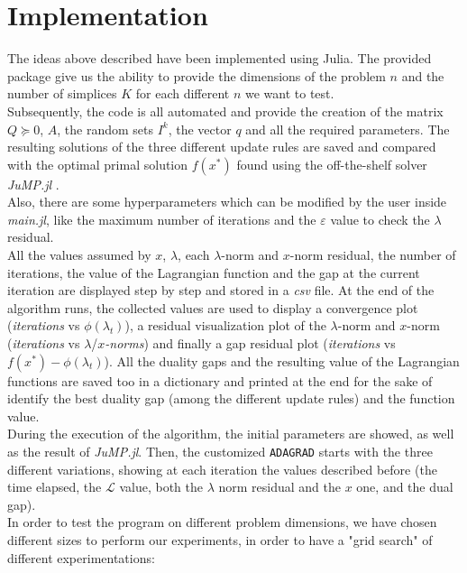 \documentclass[notitlepage]{article}
\begin{document}
\section{Implementation}
The ideas above described have been implemented using Julia. The provided package give us the ability to provide the dimensions of the problem $n$ and the number of simplices $K$ for each different $n$ we want to test.\\
Subsequently, the code is all automated and provide the creation of the matrix $Q \succeq 0$, $A$, the random sets $I^k$, the vector $q$ and all the required parameters. The resulting solutions 
of the three different update rules are saved and compared with the optimal primal solution $f(x^*)$ found using the off-the-shelf solver \textit{JuMP.jl} \cite{DunningHuchetteLubin2017}.\\
Also, there are some hyperparameters which can be modified by the user inside \textit{main.jl}, like the maximum number of iterations and the $\varepsilon$ value to check the $\lambda$ residual.\\
All the values assumed by $x$, $\lambda$, each $\lambda$-norm and $x$-norm residual, the number of iterations, the value of the Lagrangian function and the gap at the current iteration are displayed 
step by step and stored in a \textit{csv} file. At the end of the algorithm runs, the collected values are used to display a convergence plot (\textit{iterations} vs $\phi(\lambda_t)$), a residual visualization plot of the 
$\lambda$-norm and $x$-norm (\textit{iterations} vs $\lambda$/$x$\textit{-norms}) and finally a gap residual plot (\textit{iterations} vs $f(x^*) - \phi(\lambda_t)$). All the duality gaps and the resulting value 
of the Lagrangian functions are saved too in a dictionary and printed at the end for the sake of identify the best duality gap (among the different update rules) and the function value.\\
During the execution of the algorithm, the initial parameters are showed, as well as the result of \textit{JuMP.jl}. Then, the customized \texttt{ADAGRAD} starts with the three different variations, 
showing at each iteration the values described before (the time elapsed, the $\mathcal{L}$ value, both the $\lambda$ norm residual and the $x$ one, and the dual gap).\\
In order to test the program on different problem dimensions, we have chosen different sizes to perform our experiments, in order to have a "grid search" of different experimentations:
\end{document}
